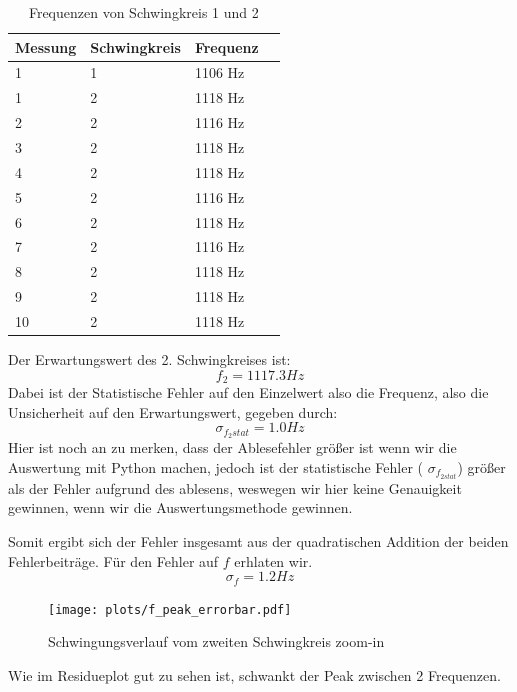 \documentclass[twoside]{protokoll}
\begin{document}
\begin{table}[H]
    \centering
    \begin{tabularx}{1\textwidth}{X X X X} %
        \toprule
        \textbf{Messung} & \textbf{Schwingkreis} & \textbf{Frequenz} \\
        \midrule
        1 & 1 & 1106 Hz \\
        \midrule
        1 & 2 & 1118 Hz \\
        2 & 2 & 1116 Hz \\
        3 & 2 & 1118 Hz \\
        4 & 2 & 1118 Hz \\
        5 & 2 & 1116 Hz \\
        6 & 2 & 1118 Hz \\
        7 & 2 & 1116 Hz \\
        8 & 2 & 1118 Hz \\
        9 & 2 & 1118 Hz \\
        10& 2 & 1118 Hz \\
        \bottomrule
    \end{tabularx}
    \caption{Frequenzen von Schwingkreis 1 und 2}
\end{table}

Der Erwartungswert des 2. Schwingkreises ist:
\begin{equation}
    f_2 = 1117.3 Hz
\end{equation}
Dabei ist der Statistische Fehler auf den Einzelwert also die Frequenz, also die Unsicherheit auf den Erwartungswert, gegeben durch:
\begin{equation}
    \sigma_{f_2 stat} = 1.0 Hz
\end{equation}
Hier ist noch an zu merken, dass der Ablesefehler größer ist wenn wir die Auswertung mit Python machen, jedoch ist der statistische Fehler ( $\sigma_{f_{2stat}}$) größer als der Fehler aufgrund des ablesens, weswegen wir hier keine Genauigkeit gewinnen, wenn wir die Auswertungsmethode gewinnen.

Somit ergibt sich der Fehler insgesamt aus der quadratischen Addition der beiden Fehlerbeiträge. Für den Fehler auf $f$ erhlaten wir.
\begin{equation}
\sigma_f = 1.2Hz
\end{equation}

\begin{figure}[H]
    \centering
    \texttt{[image: plots/f\_peak\_errorbar.pdf]}
    \caption{Schwingungsverlauf vom zweiten Schwingkreis zoom-in}
\end{figure}
Wie im Residueplot gut zu sehen ist, schwankt der Peak zwischen 2 Frequenzen.
 
\end{document}
